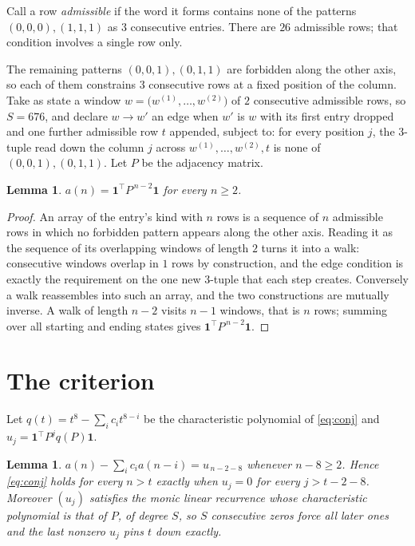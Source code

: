 \documentclass[11pt,a4paper]{article}
\theoremstyle{plain}
\newtheorem{lemma}[theorem]{Lemma}
\theoremstyle{definition}
\begin{document}
Call a row \emph{admissible} if the word it forms contains none of the patterns
$(0,0,0), (1,1,1)$ as $3$ consecutive entries. There are $26$ admissible rows; that condition
involves a single row only.

The remaining patterns $(0,0,1), (0,1,1)$ are forbidden along the other axis, so each of them
constrains $3$ consecutive rows at a fixed position of the column. Take as state a
window $w=\bigl(w^{(1)},\dots,w^{(2)}\bigr)$ of $2$ consecutive admissible
rows, so $S=676$, and declare $w\to w'$ an edge when $w'$ is $w$ with its first entry
dropped and one further admissible row $t$ appended, subject to: for every position
$j$, the $3$-tuple read down the column $j$ across $w^{(1)},\dots,w^{(2)},t$
is none of $(0,0,1), (0,1,1)$. Let $P$ be the adjacency matrix.

\begin{lemma}\label{lem:walk}
$a(n)=\mathbf{1}^{\!\top}P^{\,n-2}\mathbf{1}$ for every $n\ge2$.
\end{lemma}

\begin{proof}
An array of the entry's kind with $n$ rows is a sequence of $n$ admissible rows in
which no forbidden pattern appears along the other axis. Reading it as the sequence of its
overlapping windows of length $2$ turns it into a walk: consecutive windows overlap in
$1$ rows by construction, and the edge condition is exactly the requirement on the one
new $3$-tuple that each step creates. Conversely a walk reassembles into such an array,
and the two constructions are mutually inverse. A walk of length $n-2$ visits $n-1$
windows, that is $n$ rows; summing over all starting and ending states gives
$\mathbf{1}^{\!\top}P^{\,n-2}\mathbf{1}$.
\end{proof}

\section{The criterion}

Let $q(t)=t^{8}-\sum_i c_i t^{8-i}$ be the characteristic polynomial of
\eqref{eq:conj} and $u_j=\mathbf{1}^{\!\top}P^{j}q(P)\mathbf{1}$.

\begin{lemma}\label{lem:crit}
$a(n)-\sum_i c_i a(n-i)=u_{\,n-2-8}$ whenever $n-8\ge2$. Hence
\eqref{eq:conj} holds for every $n>t$ exactly when $u_j=0$ for every
$j>t-2-8$. Moreover $(u_j)$ satisfies the monic linear recurrence whose
characteristic polynomial is that of $P$, of degree $S$, so $S$ consecutive zeros force all
later ones and the last nonzero $u_j$ pins $t$ down exactly.
\end{lemma}
\end{document}
